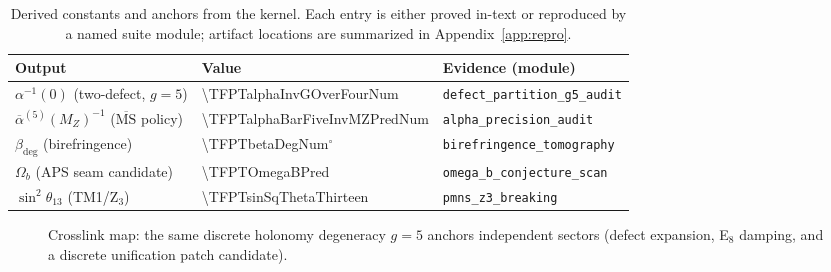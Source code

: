 \begin{table}[H]
\centering
\begin{tabular}{@{}lll@{}}
\toprule
Output & Value & Evidence (module) \\
\midrule
$\alpha^{-1}(0)$ (two-defect, $g=5$) & \num[round-mode=places,round-precision=12]{\TFPTalphaInvGOverFourNum} & \texttt{defect\_partition\_g5\_audit} \\
$\overline{\alpha}^{(5)}(M_Z)^{-1}$ ($\overline{\mathrm{MS}}$ policy) & \num[round-mode=places,round-precision=6]{\TFPTalphaBarFiveInvMZPredNum} & \texttt{alpha\_precision\_audit} \\
$\beta_{\mathrm{deg}}$ (birefringence) & \num[round-mode=places,round-precision=4]{\TFPTbetaDegNum}$^\circ$ & \texttt{birefringence\_tomography} \\
$\Omega_b$ (APS seam candidate) & \num[round-mode=places,round-precision=6]{\TFPTOmegaBPred} & \texttt{omega\_b\_conjecture\_scan} \\
$\sin^2\theta_{13}$ (TM1/Z$_3$) & \num[round-mode=places,round-precision=6]{\TFPTsinSqThetaThirteen} & \texttt{pmns\_z3\_breaking} \\
\bottomrule
\end{tabular}
\caption{Derived constants and anchors from the kernel. Each entry is either proved in-text or reproduced by a named suite module; artifact locations are summarized in Appendix~\ref{app:repro}.}
\label{tab:constant-factory}
\end{table}

\begin{figure}[H]
\centering
{}
\caption{Crosslink map: the same discrete holonomy degeneracy $g=5$ anchors independent sectors (defect expansion, E$_8$ damping, and a discrete unification patch candidate).}
\label{fig:crosslink}
\end{figure}

